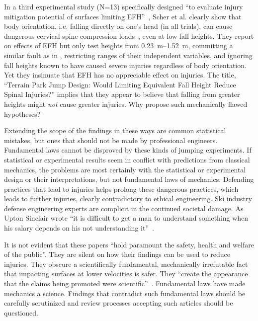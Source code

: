 \documentclass[smallextended]{svjour3}       %
\begin{document}
In a third experimental study (N=13) specifically designed ``to evaluate injury
mitigation potential of surfaces limiting EFH''~\cite{Scher2015}, Scher et al.
clearly show that body orientation, i.e. falling directly on one's head (in all
trials), can cause dangerous cervical spine compression loads~\cite{Scher2015},
even at low fall heights. They report on effects of EFH but only test heights
from \SIrange{0.23}{1.52}{\meter}, committing a similar fault as in
\cite{Shealy2010}, restricting ranges of their independent variables, and
ignoring fall heights known to have caused severe injuries regardless of body
orientation. Yet they insinuate that EFH has no appreciable effect on injuries.
The title, ``Terrain Park Jump Design: Would Limiting Equivalent Fall Height
Reduce Spinal Injuries?'' implies that they appear to believe that falling from
greater heights might \emph{not} cause greater injuries. Why propose such
mechanically flawed hypotheses?

Extending the scope of the findings in these ways are common statistical mistakes, but ones that should not be made by professional engineers. Fundamental laws cannot be disproved by these kinds of jumping experiments. If statistical or experimental results seem in conflict with predictions from classical mechanics, the problems are most certainly with the statistical or experimental design or their interpretations, but not fundamental laws of mechanics. Defending practices that lead to injuries helps prolong these dangerous practices, which leads to further injuries, clearly contradictory to ethical engineering. Ski industry defense engineering experts are complicit in the continued societal damage. As Upton Sinclair wrote ``it is difficult to get a man to understand something when his salary depends on his not understanding it''~\cite{Sinclair1994}.

It is not evident that these papers ``hold paramount the safety, health and
welfare of the public''. They are silent on how their findings can be used to
reduce injuries. They obscure a scientifically fundamental, mechanically
irrefutable fact that impacting surfaces at lower velocities is safer. They
``create the appearance that the claims being promoted were
scientific''~\cite[page 244]{Oreskes2010}. Fundamental laws have made mechanics a
science. Findings that contradict such fundamental laws should be carefully
scrutinized and review processes accepting such articles should be
questioned.
\end{document}
